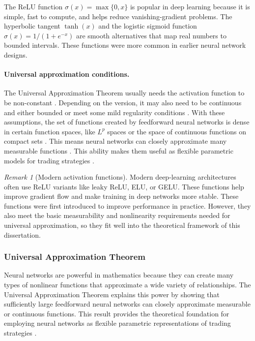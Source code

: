\documentclass[12pt,a4paper]{article}
\theoremstyle{definition}
\theoremstyle{plain}
\theoremstyle{remark}
\newtheorem{remark}{Remark}[section]
\theoremstyle{plain}
\begin{document}
The ReLU function $\sigma(x)=\max\{0,x\}$ is popular in deep learning because it is simple, fast to compute, and helps reduce vanishing-gradient problems.
The hyperbolic tangent $\tanh(x)$ and the logistic sigmoid function $\sigma(x)=1/(1+e^{-x})$ are smooth alternatives that map real numbers to bounded intervals. These functions were more common in earlier neural network designs.

\paragraph{Universal approximation conditions.}
The Universal Approximation Theorem usually needs the activation function to be non-constant \cite{Hornik1991}. Depending on the version, it may also need to be continuous and either bounded or meet some mild regularity conditions \cite{Hornik1991,HighamHigham2019DeepLearning}.
With these assumptions, the set of functions created by feedforward neural networks is dense in certain function spaces, like $L^p$ spaces or the space of continuous functions on compact sets \cite{Hornik1991}.
This means neural networks can closely approximate many measurable functions \cite{Hornik1991,HighamHigham2019DeepLearning}. This ability makes them useful as flexible parametric models for trading strategies \cite{Buehler2019DeepHedging}.

\begin{remark}[Modern activation functions]\label{rem:modern_activations}
Modern deep-learning architectures often use ReLU variants like leaky ReLU, ELU, or GELU. These functions help improve gradient flow and make training in deep networks more stable.
These functions were first introduced to improve performance in practice. However, they also meet the basic measurability and nonlinearity requirements needed for universal approximation, so they fit well into the theoretical framework of this dissertation.
\end{remark}

\subsubsection{Universal Approximation Theorem}
Neural networks are powerful in mathematics because they can create many types of nonlinear functions that approximate a wide variety of relationships.
The Universal Approximation Theorem explains this power by showing that sufficiently large feedforward neural networks can closely approximate measurable or continuous functions.
This result provides the theoretical foundation for employing neural networks as flexible parametric representations of trading strategies \cite{Buehler2019DeepHedging,Horvath2021DeepRough,HighamHigham2019DeepLearning}.
\end{document}
